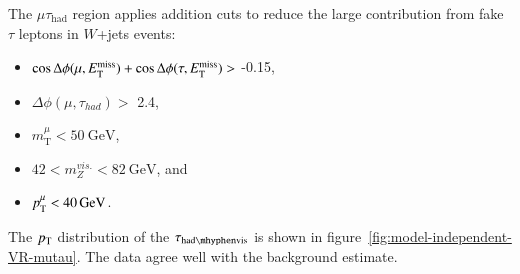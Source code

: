 The $\mu\tau_{\mathrm{had}}$ region applies addition cuts to reduce the large contribution from fake $\tau$ leptons in $W$+jets events:

\begin{itemize}
	\item $\cos{\Delta\phi(\mu, \ensuremath{E_{\text{T}}^{\text{miss}}})} + \cos{\Delta\phi(\tau, \ensuremath{E_{\text{T}}^{\text{miss}}})} >$ -0.15,
	\item $\Delta\phi(\mu, \tau_{had}) >$ 2.4,
	\item $m_{\mathrm{T}}^{\mu} < \SI{50}{\giga\electronvolt}$,
	\item $42< m_{Z}^{vis.} < \SI{82}{\giga\electronvolt}$, and
	\item $p_{\text{T}}^{\mu} < \SI{40}{\giga\electronvolt}$.
\end{itemize}

%
The $p_{\text{T}}$ distribution of the $\tauhadvis$ is shown in figure~\ref{fig:model-independent-VR-mutau}. The data agree well with the background estimate. 

